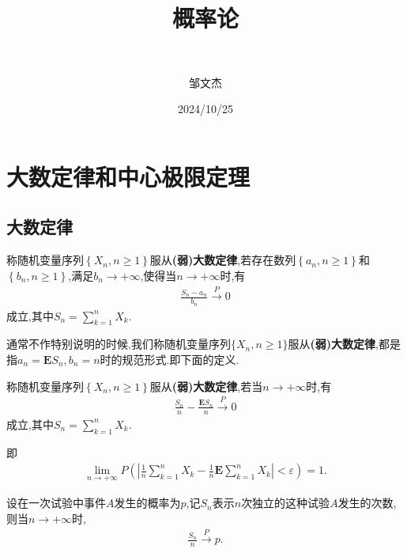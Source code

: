 \documentclass[lang=cn,newtx,10pt,scheme=chinese]{../../Template/elegantbook}
\title{概率论}
\subtitle{\,\,}
\author{邹文杰}
\institute{无}
\date{2024/10/25}
\begin{document}
\maketitle
\frontmatter

\tableofcontents

\mainmatter%

\chapter{大数定律和中心极限定理}

\section{大数定律}

\begin{definition}[(弱)大数定律]\label{definition:(弱)大数定律}
    称随机变量序列$\left\{ X_n,n\ge 1 \right\} $服从\textbf{(弱)大数定律},若存在数列$\left\{a_n,n\geqslant  1\right\}$和$\left\{b_n,n\geqslant  1\right\}$,满足$b_n \to +\infty$,使得当$n\to +\infty$时,有
    \begin{align*}
        \frac{S_n-a_n}{b_n}\overset{P}{\rightarrow}0
    \end{align*}
    成立,其中$S_n=\sum\limits_{k=1}^n{X_k}$.
\end{definition}
\begin{note}
    通常不作特别说明的时候,我们称随机变量序列$\{X_n,n\geqslant  1\}$服从\textbf{(弱)大数定律},都是指$a_n=\boldsymbol{E}S_n,b_n=n$时的规范形式.即下面的定义.
\end{note}

\begin{definition}[(弱)大数定律的规范形式]\label{definition:(弱)大数定律的规范形式}
    称随机变量序列$\left\{ X_n,n\ge 1 \right\}$服从\textbf{(弱)大数定律},若当$n\to +\infty$时,有
    \begin{align*}
        \frac{S_n}{n}-\frac{\boldsymbol{E}S_n}{n}\overset{P}{\rightarrow}0
    \end{align*}
    成立,其中$S_n=\sum\limits_{k=1}^n{X_k}$.
    
    即
    \begin{align*}
        \underset{n\rightarrow +\infty}{\lim}P\left( \left| \frac{1}{n}\sum_{k=1}^n{X_k}-\frac{1}{n}\boldsymbol{E}\sum_{k=1}^n{X_k} \right|<\varepsilon \right) =1.
    \end{align*}
\end{definition}

\begin{theorem}[Bernoulli大数定律]\label{theorem:Bernoulli大数定律}
    设在一次试验中事件$A$发生的概率为$p$,记$S_n$表示$n$次独立的这种试验$A$发生的次数,则当$n\to +\infty$时,
    \begin{align*}
        \frac{S_n}{n}\overset{P}{\rightarrow}p.
    \end{align*}
\end{theorem}
\end{document}
